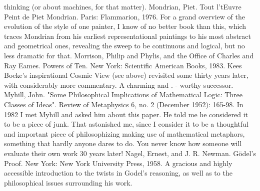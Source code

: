   thinking (or about machines, for that matter).
Mondrian, Piet. Tout l'tEuvre Peint de Piet Mondrian. Paris: Flammarion, 1976. For a grand
  overview of the evolution of the style of one painter, I know of no better book than this,
  which traces Mondrian from his earliest representational paintings to his most abstract and
  geometrical ones, revealing the sweep to be continuous and logical, but no less dramatic for
  that.
Morrison, Philip and Phylis, and the Office of Charles and Ray Eames. Powers of Ten. New
  York: Scientific American Books, 1983. Kees Boeke's inspirational Cosmic View (see
  above) revisited some thirty years later, with considerably more commentary. A charming
  and . - worthy successor.
Myhill, John. "Some Philosophical Implications of Mathematical Logic: Three Classes of
  Ideas". Review of Metaphysics 6, no. 2 (December 1952): 165-98. In 1982 I met Myhill and
  asked him about this paper. He told me he considered it to be a piece of junk. That
  astonished me, since I consider it to be a thoughtful and important piece of philosophizing
  making use of mathematical metaphors, something that hardly anyone dares to do. You
  never know how someone will evaluate their own work 30 years later!
Nagel, Ernest, and J. R. Newman. Gödel’s Proof. New York: New York University Press,
  1958. A gracious and highly accessible introduction to the twists in Godel's reasoning, as
  well as to the philosophical issues surrounding his work.




